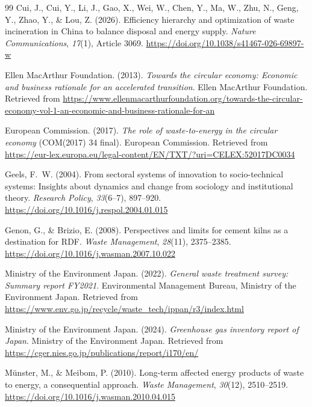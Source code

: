 \documentclass[12pt,a4paper]{article}
\begin{document}
\begin{thebibliography}{99}
Cui, J., Cui, Y., Li, J., Gao, X., Wei, W., Chen, Y., Ma, W., Zhu, N., Geng, Y., Zhao, Y., \& Lou, Z. (2026).
Efficiency hierarchy and optimization of waste incineration in China to balance disposal and energy supply.
\emph{Nature Communications}, \emph{17}(1), Article 3069.
\url{https://doi.org/10.1038/s41467-026-69897-w}

Ellen MacArthur Foundation. (2013).
\emph{Towards the circular economy: Economic and business rationale for an accelerated transition}.
Ellen MacArthur Foundation.
Retrieved from \url{https://www.ellenmacarthurfoundation.org/towards-the-circular-economy-vol-1-an-economic-and-business-rationale-for-an}

European Commission. (2017).
\emph{The role of waste-to-energy in the circular economy} (COM(2017) 34 final).
European Commission.
Retrieved from \url{https://eur-lex.europa.eu/legal-content/EN/TXT/?uri=CELEX:52017DC0034}

Geels, F.~W. (2004).
From sectoral systems of innovation to socio-technical systems: Insights about dynamics and change from sociology and institutional theory.
\emph{Research Policy}, \emph{33}(6--7), 897--920.
\url{https://doi.org/10.1016/j.respol.2004.01.015}

Genon, G., \& Brizio, E. (2008).
Perspectives and limits for cement kilns as a destination for RDF.
\emph{Waste Management}, \emph{28}(11), 2375--2385.
\url{https://doi.org/10.1016/j.wasman.2007.10.022}

Ministry of the Environment Japan. (2022).
\emph{General waste treatment survey: Summary report FY2021}.
Environmental Management Bureau, Ministry of the Environment Japan.
Retrieved from \url{https://www.env.go.jp/recycle/waste_tech/ippan/r3/index.html}

Ministry of the Environment Japan. (2024).
\emph{Greenhouse gas inventory report of Japan}.
Ministry of the Environment Japan.
Retrieved from \url{https://cger.nies.go.jp/publications/report/i170/en/}

M\"{u}nster, M., \& Meibom, P. (2010).
Long-term affected energy products of waste to energy, a consequential approach.
\emph{Waste Management}, \emph{30}(12), 2510--2519.
\url{https://doi.org/10.1016/j.wasman.2010.04.015}


\end{thebibliography}
\end{document}

